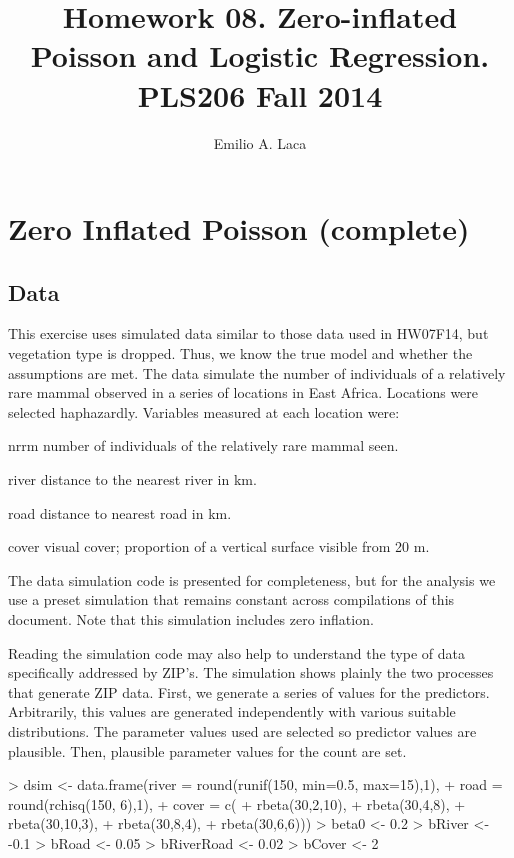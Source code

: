 \documentclass{article}
\begin{document}


\title{Homework 08. Zero-inflated Poisson and Logistic Regression. PLS206 Fall 2014}
\author{Emilio A. Laca}
\maketitle


\section {Zero Inflated Poisson (complete)}
\subsection{Data}

This exercise uses simulated data similar to those data used in HW07F14, but vegetation type is dropped. Thus, we know the true model and whether the assumptions are met. The data simulate the number of individuals of a relatively rare mammal observed in a series of locations in East Africa. Locations were selected haphazardly. Variables measured at each location were:

\begin{description*}
  \item[nrrm] number of individuals of the relatively rare mammal seen.
  \item[river] distance to the nearest river in km.
  \item[road] distance to nearest road in km.
  \item[cover] visual cover; proportion of a vertical surface visible from 20 m.
\end{description*}

The data simulation code is presented for completeness, but for the analysis we use a preset simulation that remains constant across compilations of this document. Note that this simulation includes zero inflation.

Reading the simulation code may also help to understand the type of data specifically addressed by ZIP's. The simulation shows plainly the two processes that generate ZIP data.
First, we generate a series of values for the predictors. Arbitrarily, this values are generated independently with various suitable distributions. The parameter values used are selected so predictor values are plausible. Then, plausible parameter values for the count are set.
\begin{Schunk}
\begin{Sinput}
> dsim <- data.frame(river = round(runif(150, min=0.5, max=15),1),
+                  road = round(rchisq(150, 6),1),
+                  cover = c(
+                    rbeta(30,2,10),
+                    rbeta(30,4,8),
+                    rbeta(30,10,3),
+                    rbeta(30,8,4),
+                    rbeta(30,6,6)))
> beta0 <- 0.2
> bRiver <- -0.1
> bRoad <- 0.05
> bRiverRoad <- 0.02
> bCover <- 2
\end{Sinput}
\end{Schunk}
\end{document}
